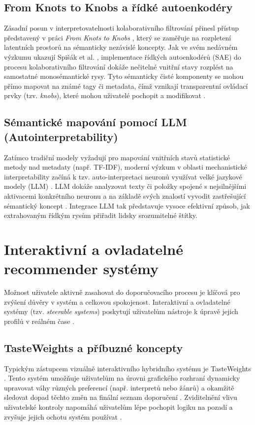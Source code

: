 \subsection{From Knots to Knobs a řídké autoenkodéry}
Zásadní posun v interpretovatelnosti kolaborativního filtrování přinesl přístup představený v práci \textit{From Knots to Knobs} \cite{Wang2021}, který se zaměřuje na rozpletení latentních prostorů na sémanticky nezávislé koncepty. Jak ve svém nedávném výzkumu ukazují Spišák et al. \cite{Spisak2024}, implementace řídkých autoenkodérů (SAE) do procesu kolaborativního filtrování dokáže nečitelné vnitřní stavy rozplést na samostatné monosémantické rysy. Tyto sémanticky čisté komponenty se mohou přímo mapovat na známé tagy či metadata, čímž vznikají transparentní ovládací prvky (tzv. \textit{knobs}), které mohou uživatelé pochopit a modifikovat \cite{Wang2021}.

\subsection{Sémantické mapování pomocí LLM (Autointerpretability)}
Zatímco tradiční modely vyžadují pro mapování vnitřních stavů statistické metody nad metadaty (např. TF-IDF), moderní výzkum v oblasti mechanistické interpretability začíná k tzv. auto-interpretaci neuronů využívat velké jazykové modely (LLM) \cite{Bills2023}. LLM dokáže analyzovat texty či položky spojené s nejsilnějšími aktivacemi konkrétního neuronu a na základě svých znalostí vyvodit zastřešující sémantický koncept \cite{ONeill2024}. Integrace LLM tak představuje vysoce efektivní způsob, jak extrahovaným řídkým rysům přiřadit lidsky srozumitelné štítky.

\section{Interaktivní a ovladatelné recommender systémy}
\label{sec:related_interactive}

Možnost uživatele aktivně zasahovat do doporučovacího procesu je klíčová pro zvýšení důvěry v systém a celkovou spokojenost. Interaktivní a ovladatelné systémy (tzv. \textit{steerable systems}) poskytují uživatelům nástroje k úpravě jejich profilů v reálném čase \cite{Ooge2023}.

\subsection{TasteWeights a příbuzné koncepty}
Typickým zástupcem vizuálně interaktivního hybridního systému je TasteWeights \cite{Bostandjiev2012}. Tento systém umožňuje uživatelům na úrovni grafického rozhraní dynamicky upravovat váhy různých preferencí (např. interpretů nebo žánrů) a okamžitě sledovat dopad těchto změn na finální seznam doporučení \cite{Bostandjiev2012}. Zviditelnění vlivu uživatelské kontroly napomáhá uživatelům lépe pochopit logiku na pozadí a zvyšuje jejich ochotu systém používat \cite{Ooge2023}.

